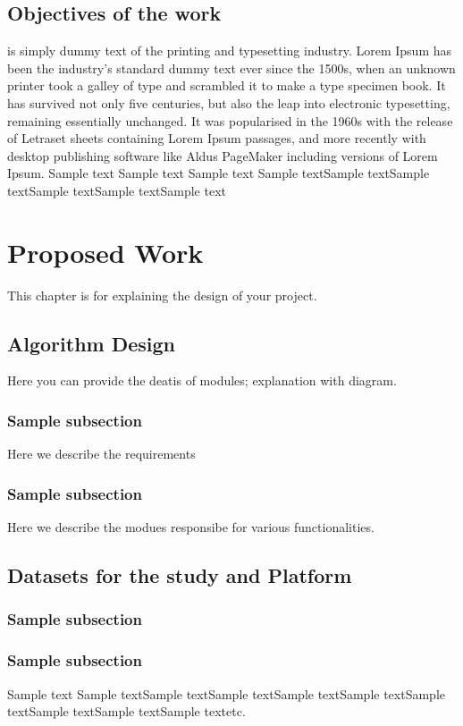 \documentclass[MTech]{ugthesis}
\begin{document}
\section{Objectives of the work}is simply dummy text of the printing and typesetting industry. Lorem Ipsum has been the industry's standard dummy text ever since the 1500s, when an unknown printer took a galley of type and scrambled it to make a type specimen book. It has survived not only five centuries, but also the leap into electronic typesetting, remaining essentially unchanged. It was popularised in the 1960s with the release of Letraset sheets containing Lorem Ipsum passages, and more recently with desktop publishing software like Aldus PageMaker including versions of Lorem Ipsum.
Sample text Sample text Sample text Sample textSample textSample textSample textSample textSample text
\chapter{Proposed Work}
This chapter is for explaining the design of your project.
\section{Algorithm Design}
Here you can provide the deatis of modules; explanation with diagram.
\subsection{Sample subsection}
Here we describe the requirements
\subsection{Sample subsection}
Here we describe the modues responsibe for various functionalities.
\section{Datasets for the study and Platform}
\subsection{Sample subsection}
\subsection{Sample subsection}
Sample text Sample textSample textSample textSample textSample textSample textSample textSample textSample textetc.
\end{document}
